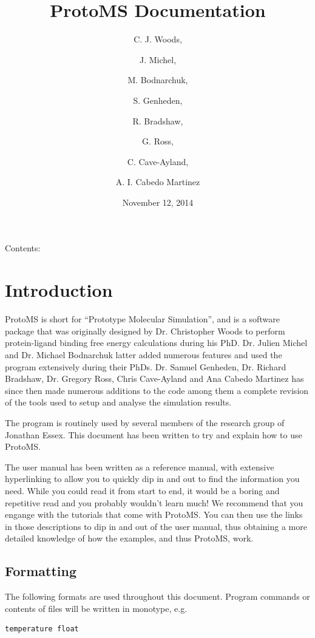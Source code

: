 \documentclass[letterpaper,10pt,english]{sphinxmanual}
\title{ProtoMS Documentation}
\date{November 12, 2014}
\author{C. J. Woods, \and J. Michel, \and M. Bodnarchuk, \and S. Genheden, \and R. Bradshaw, \and G. Ross, \and C. Cave-Ayland, \and A. I. Cabedo Martinez}
\begin{document}
\maketitle
\tableofcontents
{}\label{index::doc}


Contents:


\chapter{Introduction}
\label{introduction:welcome-to-the-protoms-documentation}\label{introduction:introduction}\label{introduction::doc}
ProtoMS is short for “Prototype Molecular Simulation”, and is a software package that was originally designed by Dr. Christopher Woods to perform protein-ligand binding free energy calculations during his PhD. Dr. Julien Michel and Dr. Michael Bodnarchuk latter added numerous features and used the program extensively during their PhDs. Dr. Samuel Genheden, Dr. Richard Bradshaw, Dr. Gregory Ross, Chris Cave-Ayland and Ana Cabedo Martinez has since then made numerous additions to the code among them a complete revision of the tools used to setup and analyse the simulation results.

The program is routinely used by several members of the research group of Jonathan Essex. This document has been written to try and explain how to use ProtoMS.

The user manual has been written as a reference manual, with extensive hyperlinking to allow you to quickly dip in and out to find the information you need. While you could read it from start to end, it would be a boring and repetitive read and you probably wouldn’t learn much! We recommend that you engange with the tutorials that come with ProtoMS. You can then use the links in those descriptions to dip in and out of the user manual, thus obtaining a more detailed knowledge of how the examples, and thus ProtoMS, work.


\section{Formatting}
\label{introduction:formatting}
The following formats are used throughout this document. Program commands or contents of files will be written in monotype, e.g.

\begin{Verbatim}[commandchars=\\\{\}]
temperature float
\end{Verbatim}
\end{document}
